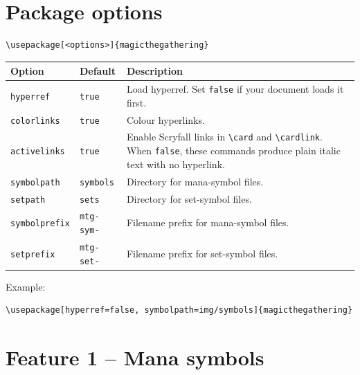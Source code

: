 \documentclass[a4paper,11pt]{article}
\newcommand{\pkg}[1]{\textsf{#1}}
\newcommand{\opt}[1]{\texttt{#1}}
\newcommand{\cmd}[1]{\texttt{\textbackslash#1}}
\begin{document}
\section{Package options}
\label{sec:options}

\begin{lstlisting}
\usepackage[<options>]{magicthegathering}
\end{lstlisting}

\medskip
\begin{center}
\begin{tabular}{@{} l l p{6.8cm} @{}}
  \toprule
  \textbf{Option} & \textbf{Default} & \textbf{Description} \\
  \midrule
  \opt{hyperref}    & \opt{true}    & Load \pkg{hyperref}.
      Set \opt{false} if your document loads it first. \\[3pt]
  \opt{colorlinks}  & \opt{true}    & Colour hyperlinks. \\[3pt]
  \opt{activelinks} & \opt{true}    & Enable Scryfall links in
      \cmd{card} and \cmd{cardlink}.  When \opt{false},
      these commands produce plain italic text
      with no hyperlink. \\[3pt]
  \opt{symbolpath}  & \opt{symbols} & Directory for
      mana-symbol files. \\[3pt]
  \opt{setpath}     & \opt{sets}    & Directory for
      set-symbol files. \\[3pt]
  \opt{symbolprefix} & \opt{mtg-sym-} & Filename prefix for
      mana-symbol files. \\[3pt]
  \opt{setprefix}    & \opt{mtg-set-} & Filename prefix for
      set-symbol files. \\
  \bottomrule
\end{tabular}
\end{center}

\medskip\noindent Example:
\begin{lstlisting}
\usepackage[hyperref=false, symbolpath=img/symbols]{magicthegathering}
\end{lstlisting}

\section{Feature 1 -- Mana symbols}
\end{document}
